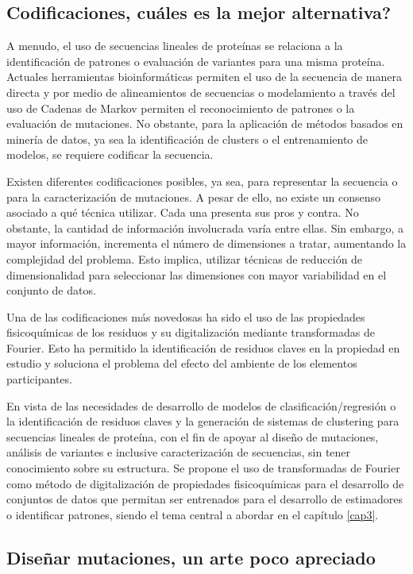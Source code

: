 \subsection{Codificaciones, cuáles es la mejor alternativa?}

A menudo, el uso de secuencias lineales de proteínas se relaciona a la identificación de patrones o evaluación de variantes para una misma proteína. Actuales herramientas bioinformáticas permiten el uso de la secuencia de manera directa y por medio de alineamientos de secuencias o modelamiento a través del uso de Cadenas de Markov permiten el reconocimiento de patrones o la evaluación de mutaciones. No obstante, para la aplicación de métodos basados en minería de datos, ya sea la identificación de clusters o el entrenamiento de modelos, se requiere codificar la secuencia.

Existen diferentes codificaciones posibles, ya sea, para representar la secuencia o para la caracterización de mutaciones. A pesar de ello, no existe un consenso asociado a qué técnica utilizar. Cada una presenta sus pros y contra. No obstante, la cantidad de información involucrada varía entre ellas. Sin embargo, a mayor información, incrementa el número de dimensiones a tratar, aumentando la complejidad del problema. Esto implica, utilizar técnicas de reducción de dimensionalidad para seleccionar las dimensiones con mayor variabilidad en el conjunto de datos.

Una de las codificaciones más novedosas ha sido el uso de las propiedades fisicoquímicas de los residuos y su digitalización mediante transformadas de Fourier. Esto ha permitido la identificación de residuos claves en la propiedad en estudio y soluciona el problema del efecto del ambiente de los elementos participantes.

En vista de las necesidades de desarrollo de modelos de clasificación/regresión o la identificación de residuos claves y la generación de sistemas de clustering para secuencias lineales de proteína, con el fin de apoyar al diseño de mutaciones, análisis de variantes e inclusive caracterización de secuencias, sin tener conocimiento sobre su estructura. Se propone el uso de transformadas de Fourier como método de digitalización de propiedades fisicoquímicas para el desarrollo de conjuntos de datos que permitan ser entrenados para el desarrollo de estimadores o identificar patrones, siendo el tema central a abordar en el capítulo \ref{cap3}.

\subsection{Diseñar mutaciones, un arte poco apreciado}


